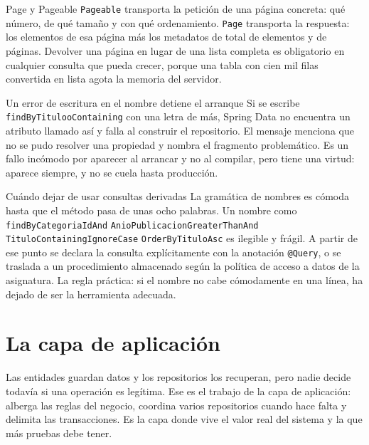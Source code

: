\documentclass[11pt,a4paper,openany]{book}
\begin{document}
\begin{cajadefinicion}{Page y Pageable}
	\texttt{Pageable} transporta la petición de una página concreta: qué número, de qué tamaño y con qué ordenamiento. \texttt{Page} transporta la respuesta: los elementos de esa página más los metadatos de total de elementos y de páginas. Devolver una página en lugar de una lista completa es obligatorio en cualquier consulta que pueda crecer, porque una tabla con cien mil filas convertida en lista agota la memoria del servidor.
\end{cajadefinicion}

\begin{cajaadvertencia}{Un error de escritura en el nombre detiene el arranque}
	Si se escribe \texttt{findByTitulooContaining} con una letra de más, Spring Data no encuentra un atributo llamado así y falla al construir el repositorio. El mensaje menciona que no se pudo resolver una propiedad y nombra el fragmento problemático. Es un fallo incómodo por aparecer al arrancar y no al compilar, pero tiene una virtud: aparece siempre, y no se cuela hasta producción.
\end{cajaadvertencia}

\begin{cajabuenas}{Cuándo dejar de usar consultas derivadas}
	La gramática de nombres es cómoda hasta que el método pasa de unas ocho palabras. Un nombre como \texttt{findByCategoriaIdAnd} \texttt{AnioPublicacionGreaterThanAnd} \texttt{TituloContainingIgnoreCase} \texttt{OrderByTituloAsc} es ilegible y frágil. A partir de ese punto se declara la consulta explícitamente con la anotación \texttt{@Query}, o se traslada a un procedimiento almacenado según la política de acceso a datos de la asignatura. La regla práctica: si el nombre no cabe cómodamente en una línea, ha dejado de ser la herramienta adecuada.
\end{cajabuenas}

\chapter{La capa de aplicación}
\label{cap:aplicacion}

Las entidades guardan datos y los repositorios los recuperan, pero nadie decide todavía si una operación es legítima. Ese es el trabajo de la capa de aplicación: alberga las reglas del negocio, coordina varios repositorios cuando hace falta y delimita las transacciones. Es la capa donde vive el valor real del sistema y la que más pruebas debe tener.
\end{document}
